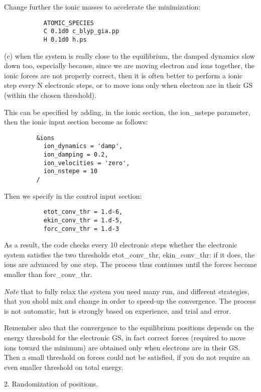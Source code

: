 \documentclass[12pt,a4paper]{article}
\begin{document}
Change further the ionic masses to accelerate the minimization:
\begin{verbatim} 
           ATOMIC_SPECIES
           C 0.1d0 c_blyp_gia.pp
           H 0.1d0 h.ps
\end{verbatim}

(c) when the system is really close to the equilibrium, the damped dynamics 
slow down too, especially because, since we are moving electron and ions 
together, the ionic forces are not properly correct, then it is often better 
to perform a ionic step every N electronic steps, or to move ions only when
electron are in their GS (within the chosen threshold).
    
This can be specified by adding, in the ionic section, the ion\_nstepe
parameter, then the ionic input section become as follows:
\begin{verbatim} 
         &ions
           ion_dynamics = 'damp',
           ion_damping = 0.2,
           ion_velocities = 'zero',
           ion_nstepe = 10
         /
\end{verbatim}
Then we specify in the control input section:
\begin{verbatim} 
           etot_conv_thr = 1.d-6,
           ekin_conv_thr = 1.d-5,
           forc_conv_thr = 1.d-3
\end{verbatim}
As a result, the code checks every 10 electronic steps whether
the electronic system satisfies the two thresholds etot\_conv\_thr,
ekin\_conv\_thr: if it does, the ions are advanced by one step.
The process thus continues until the forces become smaller than
forc\_conv\_thr.

{\em Note} that to fully relax the system you need many run, and different 
strategies, that you shold mix and change in order to speed-up the convergence.
The process is not automatic, but is strongly based on experience, and trial 
and error.

Remember also that the convergence to the equilibrium positions depends on 
the energy threshold for the electronic GS, in fact correct forces (required
to move ions toward the minimum) are obtained only when electrons are in their 
GS. Then a small threshold on forces could not be satisfied, if you do not 
require an even smaller threshold on total energy.

2. Randomization of positions.
   
\end{document}
